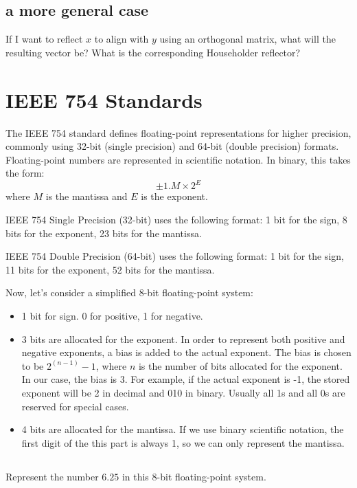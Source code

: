 \documentclass{article}%
\begin{document}
\subsection{a more general case}
If I want to reflect $x$ to align with $y$ using an orthogonal matrix, what will the resulting vector be? What is the corresponding Householder reflector?



\section{IEEE 754 Standards}
The IEEE 754 standard defines floating-point representations for higher precision, commonly using 32-bit (single precision) and 64-bit (double precision) formats. Floating-point numbers are represented in scientific notation. In binary, this takes the form:
$$
\pm 1.M \times 2^E
$$
where \( M \) is the mantissa and \( E \) is the exponent.

IEEE 754 Single Precision (32-bit) uses the following format: 1 bit for the sign, 8 bits for the exponent, 23 bits for the mantissa.

IEEE 754 Double Precision (64-bit) uses the following format: 1 bit for the sign, 11 bits for the exponent, 52 bits for the mantissa.


Now, let's consider a simplified 8-bit floating-point system:
\begin{itemize}
    \item 1 bit for sign. 0 for positive, 1 for negative.
    \item 3 bits are allocated for the exponent. In order to represent both positive and negative exponents, a bias is added to the actual exponent. The bias is chosen to be \(2^{(n-1)} - 1\), where \(n\) is the number of bits allocated for the exponent. In our case, the bias is 3. For example, if the actual exponent is -1, the stored exponent will be 2 in decimal and 010 in binary. Usually all 1s and all 0s are reserved for special cases.
    \item 4 bits are allocated for the mantissa. If we use binary scientific notation, the first digit of the this part is always 1, so we can only represent the mantissa.
\end{itemize}

\subsection{}
Represent the number \(6.25\) in this 8-bit floating-point system. 
\end{document}
